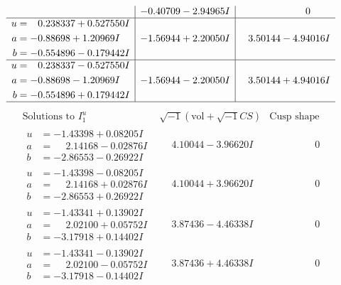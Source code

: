 \documentclass[1p]{elsarticle_modified}
\theoremstyle{definition}
\newcommand{\I}{\sqrt{-1}}
\begin{document}
$$\begin{array}{c|c|c}
 & -0.40709 - 2.94965 I & \phantom{-0.000000 } 0 \\ \hline\begin{aligned}
u &= \phantom{-}0.238337 + 0.527550 I \\
a &= -0.88698 + 1.20969 I \\
b &= -0.554896 - 0.179442 I\end{aligned}
 & -1.56944 + 2.20050 I & \phantom{-}3.50144 - 4.94016 I \\ \hline\begin{aligned}
u &= \phantom{-}0.238337 - 0.527550 I \\
a &= -0.88698 - 1.20969 I \\
b &= -0.554896 + 0.179442 I\end{aligned}
 & -1.56944 - 2.20050 I & \phantom{-}3.50144 + 4.94016 I\\
 \hline 
 \end{array}$$\newpage$$\begin{array}{c|c|c}  
\text{Solutions to }I^u_{1}& \I (\text{vol} + \sqrt{-1}CS) & \text{Cusp shape}\\
 \hline 
\begin{aligned}
u &= -1.43398 + 0.08205 I \\
a &= \phantom{-}2.14168 - 0.02876 I \\
b &= -2.86553 - 0.26922 I\end{aligned}
 & \phantom{-}4.10044 - 3.96620 I & \phantom{-0.000000 } 0 \\ \hline\begin{aligned}
u &= -1.43398 - 0.08205 I \\
a &= \phantom{-}2.14168 + 0.02876 I \\
b &= -2.86553 + 0.26922 I\end{aligned}
 & \phantom{-}4.10044 + 3.96620 I & \phantom{-0.000000 } 0 \\ \hline\begin{aligned}
u &= -1.43341 + 0.13902 I \\
a &= \phantom{-}2.02100 + 0.05752 I \\
b &= -3.17918 + 0.14402 I\end{aligned}
 & \phantom{-}3.87436 - 4.46338 I & \phantom{-0.000000 } 0 \\ \hline\begin{aligned}
u &= -1.43341 - 0.13902 I \\
a &= \phantom{-}2.02100 - 0.05752 I \\
b &= -3.17918 - 0.14402 I\end{aligned}
 & \phantom{-}3.87436 + 4.46338 I & \phantom{-0.000000 } 0 \\ \hline\begin{aligned}

\end{aligned}
\end{array}$$
\end{document}

